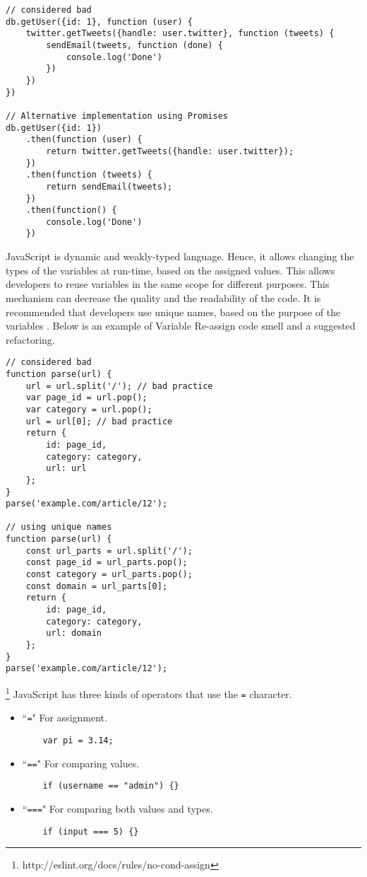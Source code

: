 \begin{lstlisting}
// considered bad
db.getUser({id: 1}, function (user) {
	twitter.getTweets({handle: user.twitter}, function (tweets) {
		sendEmail(tweets, function (done) {
			console.log('Done')
		})
	})
})

// Alternative implementation using Promises
db.getUser({id: 1})
	.then(function (user) {
		return twitter.getTweets({handle: user.twitter});
	})
	.then(function (tweets) {
		return sendEmail(tweets);
	})
	.then(function() {
		console.log('Done')
	})

\end{lstlisting}


JavaScript is dynamic and weakly-typed language. Hence, it allows changing the types of the variables at run-time, based on the assigned values. This allows developers to reuse variables in the same scope for different purposes. This mechanism can decrease the quality and the readability of the code. It is recommended that developers use unique names, based on the purpose of the variables \cite{fard2013jsnose}. Below is an example of Variable Re-assign code smell and a suggested refactoring.

\begin{lstlisting}
// considered bad
function parse(url) {
	url = url.split('/'); // bad practice
	var page_id = url.pop();
	var category = url.pop();
	url = url[0]; // bad practice
	return {
		id: page_id,
		category: category,
		url: url
	};
}
parse('example.com/article/12');

// using unique names
function parse(url) {
	const url_parts = url.split('/');
	const page_id = url_parts.pop();
	const category = url_parts.pop();
	const domain = url_parts[0];
	return {
		id: page_id,
		category: category,
		url: domain
	};
}
parse('example.com/article/12');

\end{lstlisting}


\footnote{http://eslint.org/docs/rules/no-cond-assign} JavaScript has three kinds of operators that use the \texttt{=} character.
\begin{itemize}
\item{
	``\texttt{=}" For assignment.
\begin{lstlisting}
	var pi = 3.14;
\end{lstlisting}
}
\item{
	``\texttt{==}" For comparing values.
\begin{lstlisting}
	if (username == "admin") {}
\end{lstlisting}
}
\item{
	``\texttt{===}" For comparing both values and types.
\begin{lstlisting}
	if (input === 5) {}
\end{lstlisting}
}
\end{itemize}

